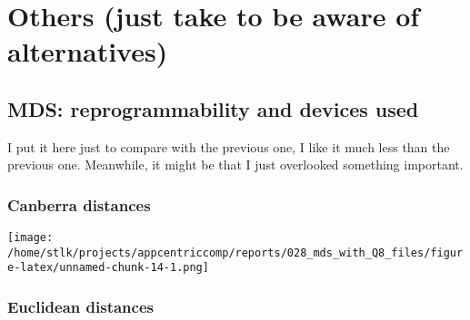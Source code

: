 \documentclass[]{article}
\newenvironment{Shaded}{\begin{snugshade}}{\end{snugshade}}
\newcommand{\KeywordTok}[1]{\textcolor[rgb]{0.13,0.29,0.53}{\textbf{{#1}}}}
\newcommand{\DataTypeTok}[1]{\textcolor[rgb]{0.13,0.29,0.53}{{#1}}}
\newcommand{\DecValTok}[1]{\textcolor[rgb]{0.00,0.00,0.81}{{#1}}}
\newcommand{\StringTok}[1]{\textcolor[rgb]{0.31,0.60,0.02}{{#1}}}
\newcommand{\NormalTok}[1]{{#1}}
\begin{document}
\section{Others (just take to be aware of
alternatives)}\label{others-just-take-to-be-aware-of-alternatives}

\subsection{MDS: reprogrammability and devices
used}\label{mds-reprogrammability-and-devices-used}

I put it here just to compare with the previous one, I like it much less
than the previous one. Meanwhile, it might be that I just overlooked
something important.

\subsubsection{Canberra distances}\label{canberra-distances}

\begin{Shaded}
\end{Shaded}

\texttt{[image: /home/stlk/projects/appcentriccomp/reports/028\_mds\_with\_Q8\_files/figure-latex/unnamed-chunk-14-1.png]}

\subsubsection{Euclidean distances}\label{euclidean-distances}
\end{document}
